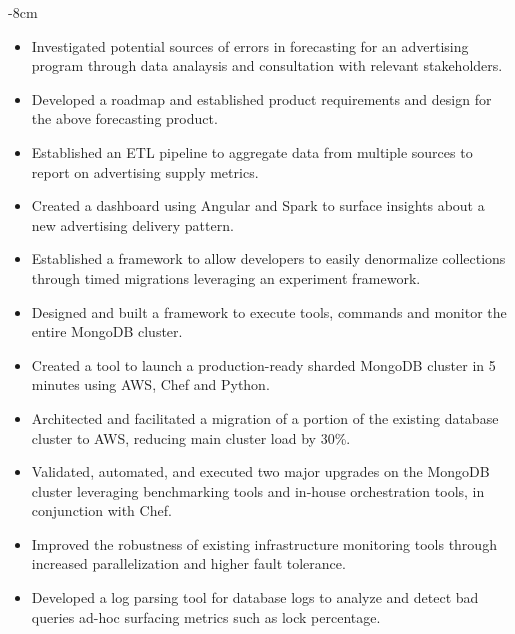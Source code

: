\documentclass[10pt,a4paper,academicons]{altacv}
\begin{document}

\begin{adjustwidth}{}{-8cm}
\makecvheader
\end{adjustwidth}


\begin{itemize}
\item Investigated potential sources of errors in forecasting for an advertising program through data analaysis and consultation with relevant stakeholders.
\item Developed a roadmap and established product requirements and design for the above forecasting product.
\item Established an ETL pipeline to aggregate data from multiple sources to report on advertising supply metrics.
\item Created a dashboard using Angular and Spark to surface insights about a new advertising delivery pattern.
\end{itemize}

\divider

\begin{itemize}
\item Established a framework to allow developers to easily denormalize collections through timed migrations leveraging an experiment framework.
\item Designed and built a framework to execute tools, commands and monitor the entire MongoDB cluster.
\item Created a tool to launch a production-ready sharded MongoDB cluster in 5
    minutes using AWS, Chef and Python.
\item Architected and facilitated a migration of a portion of the existing
    database cluster to AWS, reducing main cluster load by 30\%. 
\item Validated, automated, and executed two major upgrades on the MongoDB
    cluster leveraging benchmarking tools and in-house orchestration tools, in
        conjunction with Chef.
\item Improved the robustness of existing infrastructure monitoring tools through increased parallelization and higher fault tolerance.
\item Developed a log parsing tool for database logs to analyze and detect bad queries ad-hoc surfacing metrics such as lock percentage.
\end{itemize}
\end{document}
